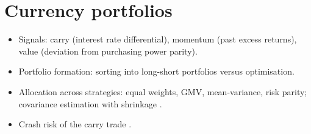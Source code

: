 \section{Currency portfolios}\label{sec:portfolios}


\begin{itemize}
  \item Signals: carry (interest rate differential), momentum (past excess returns), value (deviation from purchasing power parity).
  \item Portfolio formation: sorting into long-short portfolios versus optimisation.
  \item Allocation across strategies: equal weights, GMV, mean-variance, risk parity; covariance estimation with shrinkage \citep{ledoit2004}.
  \item Crash risk of the carry trade \citep{brunnermeier2008}.
\end{itemize}
